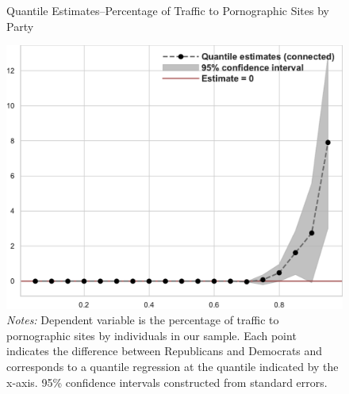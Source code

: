 \documentclass[12pt, letterpaper]{article}
\begin{document}
\begin{figure}
	\centering
	\caption{Quantile Estimates--Percentage of Traffic to Pornographic Sites by Party}
	\includegraphics[width=.6\linewidth]{../figs/quantile_reg_proportion_visits_adult.pdf}
	\caption*{\footnotesize \emph{Notes:} 
		Dependent variable is the percentage of traffic to pornographic sites by individuals in our sample.
		Each point indicates the difference between Republicans and Democrats and corresponds to a quantile regression at the quantile indicated by the x-axis.
		95\% confidence intervals constructed from standard errors.
	}
	\label{fig:quantile_regression_prop_visits}
\end{figure}
\end{document}
